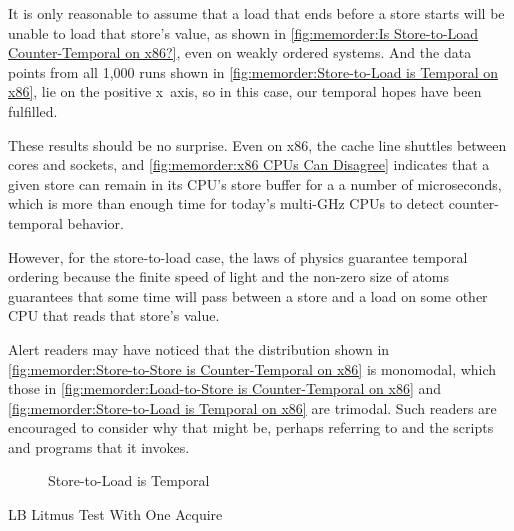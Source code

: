 {	It is only reasonable to assume that a load that ends before
	a store starts will be unable to load that store's value,
	as shown in
	\cref{fig:memorder:Is Store-to-Load Counter-Temporal on x86?},
	even on weakly ordered systems.
	And the data points from all 1,000 runs shown in
	\cref{fig:memorder:Store-to-Load is Temporal on x86},
	lie on the positive x~axis,
	so in this case, our temporal hopes have been fulfilled.

	These results should be no surprise.
	Even on x86, the cache line shuttles between cores and sockets, and
	\cref{fig:memorder:x86 CPUs Can Disagree}
	indicates that a given store can remain in its CPU's store buffer
	for a a number of microseconds, which is more than enough time
	for today's multi-GHz CPUs to detect counter-temporal behavior.

	However, for the store-to-load case, the laws of physics guarantee
	temporal ordering because the finite speed of light and the non-zero
	size of atoms guarantees that some time will pass between a store
	and a load on some other CPU that reads that store's value.

	Alert readers may have noticed that the distribution shown in
	\cref{fig:memorder:Store-to-Store is Counter-Temporal on x86}
	is monomodal, which those in
	\cref{fig:memorder:Load-to-Store is Counter-Temporal on x86}
	and
	\cref{fig:memorder:Store-to-Load is Temporal on x86}
	are trimodal.
	Such readers are encouraged to consider why that might be,
	perhaps referring to  and
	the scripts and programs that it invokes.

}\QuickQuizEnd

\begin{figure}
\centering
{}
\caption{Store-to-Load is Temporal}
\label{fig:memorder:Store-to-Load is Temporal}
\end{figure}

\begin{listing}

\caption{LB Litmus Test With One Acquire}
\label{lst:memorder:LB Litmus Test With One Acquire}
\end{listing}

